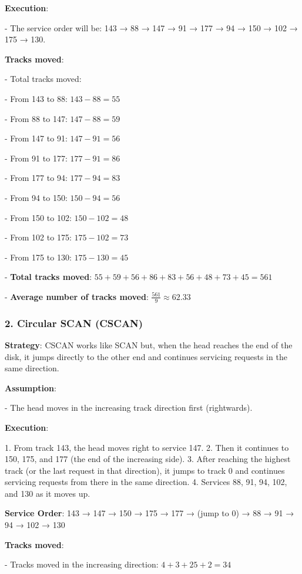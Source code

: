 \documentclass[a4paper]{book}
\begin{document}
\textbf{Execution}:

- The service order will be: 143 → 88 → 147 → 91 → 177 → 94 → 150 → 102 → 175 → 130.


\textbf{Tracks moved}:

- Total tracks moved:

  
  - From 143 to 88: \(143 - 88 = 55\)

  - From 88 to 147: \(147 - 88 = 59\)

  - From 147 to 91: \(147 - 91 = 56\)

  - From 91 to 177: \(177 - 91 = 86\)

  - From 177 to 94: \(177 - 94 = 83\)

  - From 94 to 150: \(150 - 94 = 56\)

  - From 150 to 102: \(150 - 102 = 48\)

  - From 102 to 175: \(175 - 102 = 73\)

  - From 175 to 130: \(175 - 130 = 45\)


- \textbf{Total tracks moved}: \(55 + 59 + 56 + 86 + 83 + 56 + 48 + 73 + 45 = 561\)


- \textbf{Average number of tracks moved}: \(\frac{561}{9} \approx 62.33\)


\subsubsection{2. \textbf{Circular SCAN (CSCAN)}}

\textbf{Strategy}:
CSCAN works like SCAN but, when the head reaches the end of the disk, it jumps directly to the other end and continues servicing requests in the same direction.

\textbf{Assumption}:

- The head moves in the increasing track direction first (rightwards).


\textbf{Execution}:

1. From track 143, the head moves right to service 147.
2. Then it continues to 150, 175, and 177 (the end of the increasing side).
3. After reaching the highest track (or the last request in that direction), it jumps to track 0 and continues servicing requests from there in the same direction.
4. Services 88, 91, 94, 102, and 130 as it moves up.

\textbf{Service Order}: 143 → 147 → 150 → 175 → 177 → (jump to 0) → 88 → 91 → 94 → 102 → 130

\textbf{Tracks moved}:

- Tracks moved in the increasing direction: \(4 + 3 + 25 + 2 = 34\)
\end{document}
